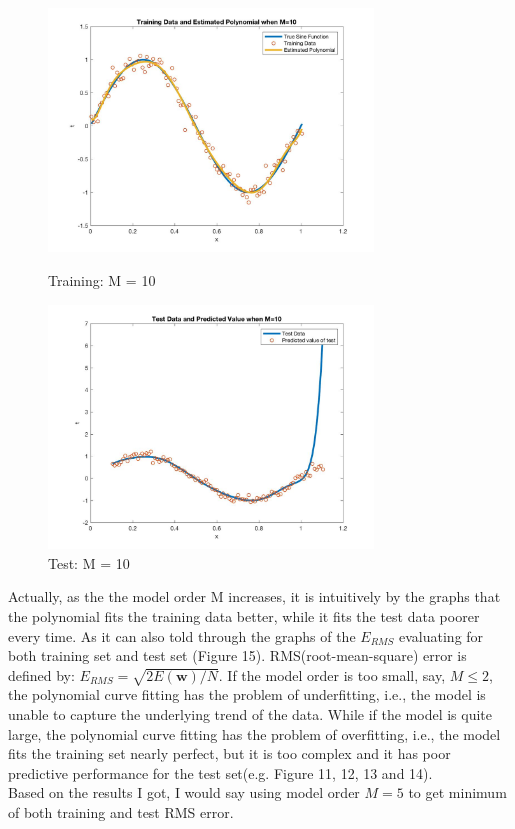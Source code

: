 \documentclass[a4paper]{article}
\begin{document}
\begin{spacing}{2.0}
	\begin{figure}[H]
	    \begin{minipage}[t]{0.5\textwidth}
	        \centering
	        \includegraphics[width=3.4in]{10train.jpeg}
	        \caption{Training: M = 10}
	        \label{fig:side:a}
	    \end{minipage}%
	  \begin{minipage}[t]{0.5\textwidth}
	      \centering
	      \includegraphics[width=3.4in]{10test.jpeg}
	      \caption{Test: M = 10}
	      \label{fig:side:b}
	    \end{minipage}
	\end{figure}

	Actually, as the the model order M increases, it is intuitively by the graphs that the polynomial fits the training data 	better, while it fits the test data poorer every time. As it can also told through the graphs of the $E_{RMS}$ 		evaluating for both training set and test set (Figure 15). RMS(root-mean-square) error is defined by: $E_{RMS} = 	\sqrt{2E(\boldsymbol{w})/N}$. If the model order is too small, say, $M \leq 2$, the polynomial curve fitting has the 	problem of underfitting, i.e., the model is unable to capture the underlying trend of the data. While if the model is 	quite large, the polynomial curve fitting has the problem of overfitting, i.e., the model fits the training set nearly 		perfect, but it is too complex and it has poor predictive performance for the test set(e.g. Figure 11, 12, 13 and 14).\\
	Based on the results I got, I would say using model order $M = 5$ to get minimum of both training and test RMS error. 
	

\end{spacing}
\end{document}
